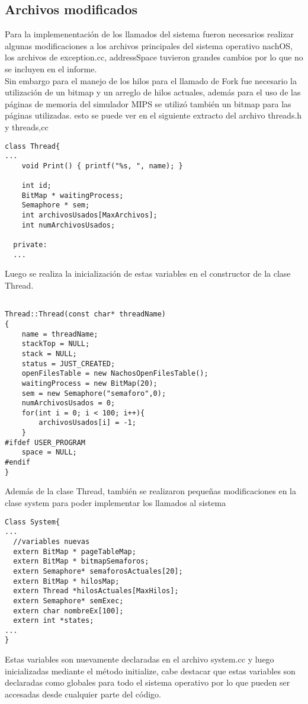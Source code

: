   \subsection{Archivos modificados}
    Para la implemenentación de los llamados del sistema fueron necesarios realizar algunas modificaciones a los archivos principales del sistema operativo nachOS, los archivos de exception.cc, addressSpace tuvieron grandes cambios por lo que no se incluyen en el informe.\\
    Sin embargo para el manejo de los hilos para el llamado de Fork fue necesario la utilización de un bitmap y un arreglo de hilos actuales, además para el uso de las páginas de memoria del simulador MIPS se utilizó también un bitmap para las páginas utilizadas. esto se puede ver en el siguiente extracto del archivo threads.h y threads,cc
    \begin{lstlisting}
class Thread{
...
    void Print() { printf("%s, ", name); }
	
    int id;
    BitMap * waitingProcess;
    Semaphore * sem;
    int archivosUsados[MaxArchivos];
    int numArchivosUsados;

  private:
  ...
    \end{lstlisting}
    Luego se realiza la inicialización de estas variables en el constructor de la clase Thread.
    \begin{lstlisting}

Thread::Thread(const char* threadName)
{
    name = threadName;
    stackTop = NULL;
    stack = NULL;
    status = JUST_CREATED;
    openFilesTable = new NachosOpenFilesTable(); 
    waitingProcess = new BitMap(20);
    sem = new Semaphore("semaforo",0);
    numArchivosUsados = 0;
    for(int i = 0; i < 100; i++){
    	archivosUsados[i] = -1;
    }
#ifdef USER_PROGRAM
    space = NULL;
#endif
}
    \end{lstlisting}
     Además de la clase Thread, también se realizaron pequeñas modificaciones en la clase system para poder implementar los llamados al sistema
     \begin{lstlisting}
Class System{
...
  //variables nuevas
  extern BitMap * pageTableMap;
  extern BitMap * bitmapSemaforos;
  extern Semaphore* semaforosActuales[20];
  extern BitMap * hilosMap;
  extern Thread *hilosActuales[MaxHilos]; 
  extern Semaphore* semExec;                          
  extern char nombreEx[100];                          
  extern int *states;                                
...
}     
     \end{lstlisting}
     Estas variables son nuevamente declaradas en el archivo system.cc y luego inicializadas mediante el método initialize, cabe destacar que estas variables son declaradas como globales para todo el sistema operativo por lo que pueden ser accesadas desde cualquier parte del código.

    

